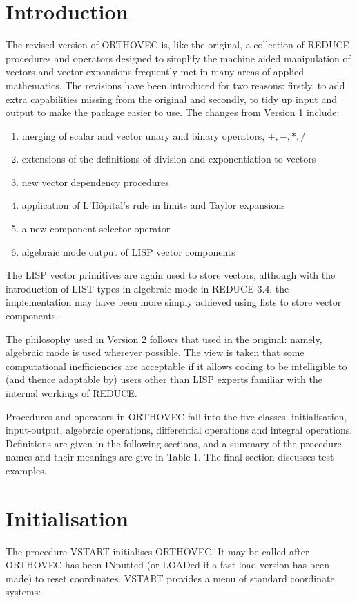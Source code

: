 \section{Introduction}
The revised version of ORTHOVEC\cite{Eastwood:91} is, like the
original\cite{Eastwood:87}, a collection of REDUCE procedures and
operators designed to simplify the machine aided manipulation of vectors
and vector expansions frequently met in many areas of applied mathematics.
The revisions have been introduced for two reasons: firstly, to add extra
capabilities missing from the original and secondly, to tidy up input and
output to make the package easier to use.
\newpage
The changes from Version 1 include:

\begin{enumerate}
\item merging of scalar and vector unary and binary operators, $+, - , *, /
$
\item extensions of the definitions of division and exponentiation 
to vectors
\item new vector dependency procedures
\item application of L'H\^opital's rule in limits and Taylor expansions
\item a new component selector operator
\item algebraic mode output of LISP vector components
\end{enumerate}

The LISP vector primitives are again used to store vectors, although 
with the introduction of LIST types in algebraic mode in REDUCE
3.4, the implementation may have been more simply achieved 
using lists to store vector components.

The philosophy used in Version 2 follows that used in the original:
namely, algebraic mode is used wherever possible.  The view is taken
that some computational inefficiencies are acceptable if it allows
coding to be intelligible to (and thence adaptable by) users other
than LISP experts familiar with the internal workings of REDUCE.

Procedures and operators in ORTHOVEC fall into the five classes: 
initialisation, input-output, algebraic operations, differential
operations and integral operations.  Definitions are given in 
the following sections, and
a summary of the procedure names and their meanings are give in Table 1.
The final section discusses test examples.

\section{Initialisation}\label{vstart}
The procedure VSTART initialises ORTHOVEC.  It may be
called after ORTHOVEC has been INputted (or LOADed if a fast load
version has been made) to reset coordinates.  VSTART provides a
menu of standard coordinate systems:-


